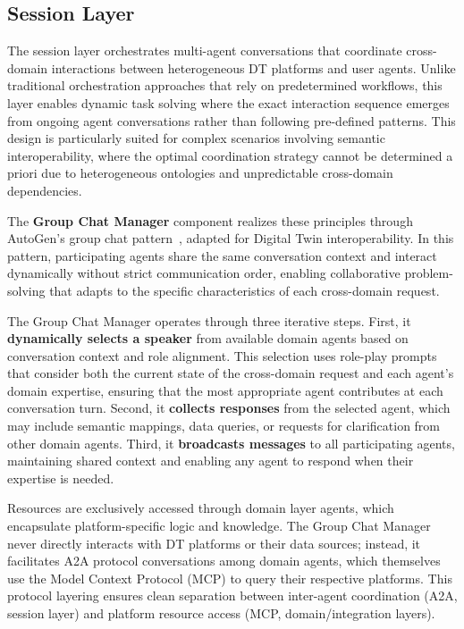 \subsection{Session Layer}
\label{subsec:session-layer}

The session layer orchestrates multi-agent conversations that coordinate
    cross-domain interactions between heterogeneous DT platforms and user agents.
Unlike traditional orchestration approaches that rely on predetermined workflows,
    this layer enables dynamic task solving where the exact interaction sequence
    emerges from ongoing agent conversations rather than following pre-defined patterns.
This design is particularly suited for complex scenarios involving semantic interoperability,
    where the optimal coordination strategy cannot be determined a priori due to
    heterogeneous ontologies and unpredictable cross-domain dependencies.

The \textbf{Group Chat Manager} component realizes these principles through
    AutoGen's group chat pattern~\cite{wu2024autogen}, adapted for Digital Twin interoperability.
In this pattern, participating agents share the same conversation context and
    interact dynamically without strict communication order,
    enabling collaborative problem-solving that adapts to the specific characteristics
    of each cross-domain request.

The Group Chat Manager operates through three iterative steps.
First, it \textbf{dynamically selects a speaker} from available domain agents
    based on conversation context and role alignment.
This selection uses role-play prompts that consider both the current state of
    the cross-domain request and each agent's domain expertise,
    ensuring that the most appropriate agent contributes at each conversation turn.
Second, it \textbf{collects responses} from the selected agent,
    which may include semantic mappings, data queries, or requests for clarification
    from other domain agents.
Third, it \textbf{broadcasts messages} to all participating agents,
    maintaining shared context and enabling any agent to respond when their expertise is needed.

Resources are exclusively accessed through domain layer agents,
    which encapsulate platform-specific logic and knowledge.
The Group Chat Manager never directly interacts with DT platforms or their data sources;
    instead, it facilitates A2A protocol conversations among domain agents,
    which themselves use the Model Context Protocol (MCP) to
    query their respective platforms.
This protocol layering ensures clean separation between
    inter-agent coordination (A2A, session layer) and
    platform resource access (MCP, domain/integration layers).

